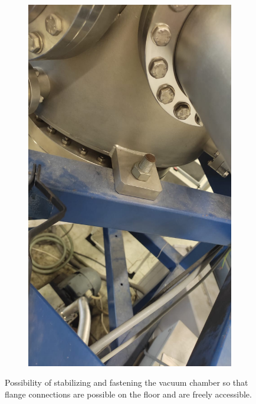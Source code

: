 \begin{figure}[H]
\begin{subfigure}[b]{0.3\textwidth}
        \centering
        \includegraphics[width=1\textwidth]{sections/imges/vacuum_vessel/Halterung2.jpeg}
        \label{fig:Halterung2}
    \end{subfigure}
    \caption{Possibility of stabilizing and fastening the vacuum chamber so that flange connections are possible on the floor and are freely accessible.}
    \label{fig:Halterung}
\end{figure}

